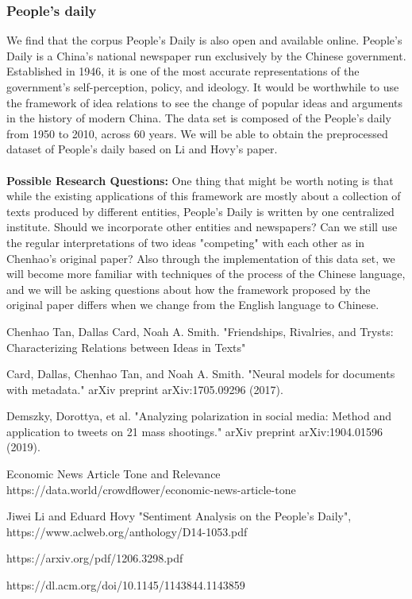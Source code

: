 \documentclass{article}
\begin{document}
\subsubsection{People's daily}
We find that the corpus People's Daily is also open and available online. People's Daily is a China's national newspaper run exclusively by the Chinese government. Established in 1946, it is one of the most accurate representations of the government's self-perception, policy, and ideology. It would be worthwhile to use the framework of idea relations to see the change of popular ideas and arguments in the history of modern China. The data set is composed of the People’s daily from 1950 to 2010, across 60 years. We will be able to obtain the preprocessed dataset of People's daily based on Li and Hovy's paper. \cite{Jiwei}
\\ \\ 
\textbf{Possible Research Questions:}
One thing that might be worth noting is that while the existing applications of this framework are mostly about a collection of texts produced by different entities, People's Daily is written by one centralized institute. Should we incorporate other entities and newspapers? Can we still use the regular interpretations of two ideas "competing" with each other as in Chenhao's original paper? Also through the implementation of this data set, we will become more familiar with techniques of the process of the Chinese language, and we will be asking questions about how the framework proposed by the original paper differs when we change from the English language to Chinese. 

\begin{thebibliography}{999}

Chenhao Tan, Dallas Card, Noah A. Smith. "Friendships, Rivalries, and Trysts: Characterizing Relations between Ideas in Texts"

Card, Dallas, Chenhao Tan, and Noah A. Smith. "Neural models for documents with metadata." arXiv preprint arXiv:1705.09296 (2017).

Demszky, Dorottya, et al. "Analyzing polarization in social media: Method and application to tweets on 21 mass shootings." arXiv preprint arXiv:1904.01596 (2019).

Economic News Article Tone and Relevance https://data.world/crowdflower/economic-news-article-tone

Jiwei Li and Eduard Hovy "Sentiment Analysis on the People’s Daily", https://www.aclweb.org/anthology/D14-1053.pdf

https://arxiv.org/pdf/1206.3298.pdf

https://dl.acm.org/doi/10.1145/1143844.1143859
 
\end{thebibliography}
\end{document}
